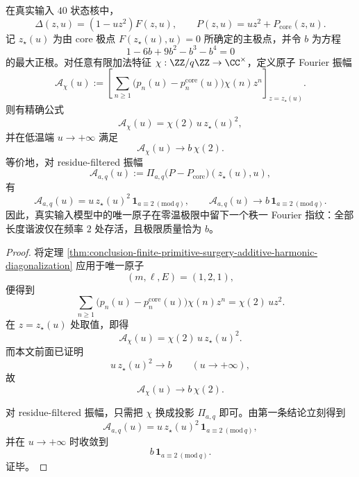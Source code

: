 \begin{corollary}\label{cor:conclusion-realinput40-atomic-fourier-fingerprint}
在真实输入 \(40\) 状态核中，
\[
\Delta(z,u)=(1-uz^2)F(z,u),
\qquad
P(z,u)=uz^2+P_{\mathrm{core}}(z,u).
\]
记 \(z_\star(u)\) 为由 core 极点 \(F(z_\star(u),u)=0\) 所确定的主极点，并令 \(b\) 为方程
\[
1-6b+9b^2-b^3-b^4=0
\]
的最大正根。对任意有限加法特征 \(\chi:\ZZ/q\ZZ\to \CC^\times\)，定义原子 Fourier 振幅
\[
\mathcal A_\chi(u)
:=
\left[\sum_{n\ge 1}\bigl(p_n(u)-p_n^{\mathrm{core}}(u)\bigr)\chi(n)z^n\right]_{z=z_\star(u)}.
\]
则有精确公式
\[
\mathcal A_\chi(u)=\chi(2)\,u\,z_\star(u)^2,
\]
并在低温端 \(u\to +\infty\) 满足
\[
\mathcal A_\chi(u)\longrightarrow b\,\chi(2).
\]
等价地，对 residue-filtered 振幅
\[
\mathcal A_{a,q}(u):=
\Pi_{a,q}\!\bigl(P-P_{\mathrm{core}}\bigr)(z_\star(u),u),
\]
有
\[
\mathcal A_{a,q}(u)=u\,z_\star(u)^2\,\mathbf 1_{a\equiv 2\ (\mathrm{mod}\ q)},
\qquad
\mathcal A_{a,q}(u)\longrightarrow b\,\mathbf 1_{a\equiv 2\ (\mathrm{mod}\ q)}.
\]
因此，真实输入模型中的唯一原子在零温极限中留下一个秩一 Fourier 指纹：全部长度谐波仅在频率 \(2\) 处存活，且极限质量恰为 \(b\)。
\end{corollary}
\begin{proof}
将定理 \ref{thm:conclusion-finite-primitive-surgery-additive-harmonic-diagonalization} 应用于唯一原子
\[
(m,\ell,E)=(1,2,1),
\]
便得到
\[
\sum_{n\ge 1}\bigl(p_n(u)-p_n^{\mathrm{core}}(u)\bigr)\chi(n)z^n
=
\chi(2)\,u z^2.
\]
在 \(z=z_\star(u)\) 处取值，即得
\[
\mathcal A_\chi(u)=\chi(2)\,u\,z_\star(u)^2.
\]
而本文前面已证明
\[
u\,z_\star(u)^2\longrightarrow b
\qquad
(u\to +\infty),
\]
故
\[
\mathcal A_\chi(u)\longrightarrow b\,\chi(2).
\]

对 residue-filtered 振幅，只需把 \(\chi\) 换成投影 \(\Pi_{a,q}\) 即可。由第一条结论立刻得到
\[
\mathcal A_{a,q}(u)
=
u\,z_\star(u)^2\,\mathbf 1_{a\equiv 2\ (\mathrm{mod}\ q)},
\]
并在 \(u\to+\infty\) 时收敛到
\[
b\,\mathbf 1_{a\equiv 2\ (\mathrm{mod}\ q)}.
\]
证毕。
\end{proof}



\endinput

